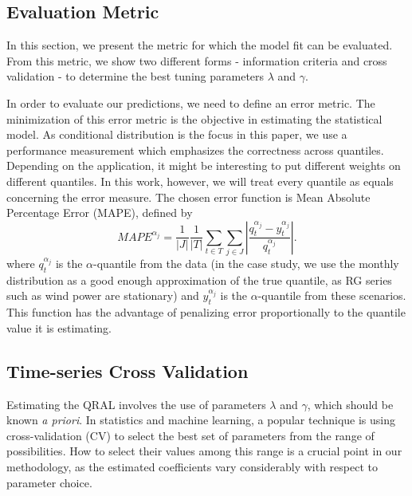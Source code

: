\subsection{Evaluation Metric}

In this section, we present the metric for which the model fit can be evaluated. From this metric, we show two different forms - information criteria and cross validation - to determine the best tuning parameters $\lambda$ and $\gamma$.

In order to evaluate our predictions, we need to define an error metric. The minimization of this error metric is the objective in estimating the statistical model. 
As conditional distribution is the focus in this paper, we use a performance measurement which emphasizes the correctness across quantiles. Depending on the application, it might be interesting to put different weights on different quantiles. In this work, however, we will treat every quantile as equals concerning the error measure.
The chosen error function is Mean Absolute Percentage Error (MAPE), defined by
\begin{equation}
MAPE^{\alpha_j}= \frac{1}{|J|} \frac{1}{|T|}  \sum_{t \in T} \sum_{j \in J} \left| \frac{q_t^{\alpha_{j}}- y_t^{\alpha_{j}}}{q_t^{\alpha_{j}}}  \right|. 
\end{equation}
where $q_t^{\alpha_{j}}$ is the $\alpha$-quantile from the data (in the case study, we use the monthly distribution as a good enough approximation of the true quantile, as RG series such as wind power are stationary) and $y_t^{\alpha_j}$ is the $\alpha$-quantile from these scenarios.
This function has the advantage of penalizing error proportionally to the quantile value it is estimating. 


\subsection{Time-series Cross Validation} \label{sec:cv}

Estimating the QRAL involves the use of parameters $\lambda$ and $\gamma$, which should be known \textit{a priori}. In statistics and machine learning, a popular technique is using cross-validation (CV) to select the best set of parameters from the range of possibilities. How to select their values among this range is a crucial point in our methodology, as the estimated coefficients vary considerably with respect to parameter choice.

